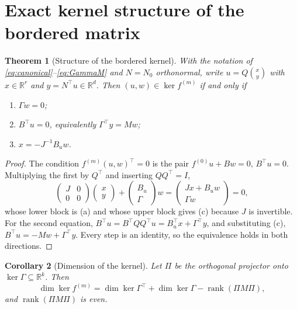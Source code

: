 \documentclass[12pt]{article}
\theoremstyle{plain}
\newtheorem{theorem}{Theorem}[section]
\newtheorem{corollary}[theorem]{Corollary}
\theoremstyle{definition}
\theoremstyle{remark}
\newcommand{\R}{\mathbb{R}}
\DeclareMathOperator{\rank}{rank}
\begin{document}
	\section{Exact kernel structure of the bordered matrix}
	\label{sec:kernel}
	
	\begin{theorem}[Structure of the bordered kernel]
		\label{thm:kernel}
		With the notation of \eqref{eq:canonical}--\eqref{eq:GammaM} and $N=N_{0}$
		orthonormal, write $u=Q\binom{x}{y}$ with $x\in\R^{r}$ and $y=N^{\top}u\in\R^{d}$.
		Then $(u,w)\in\ker f^{(m)}$ if and only if
		\begin{enumerate}[label=(\alph*),leftmargin=2.2em,itemsep=0.25em]
			\item $\Gamma w=0$;
			\item $B^{\top}u=0$, equivalently $\Gamma^{\top}y=Mw$;
			\item $x=-J^{-1}B_{u}w$.
		\end{enumerate}
	\end{theorem}
	
	\begin{proof}
		The condition $f^{(m)}(u,w)^{\top}=0$ is the pair
		$f^{(0)}u+Bw=0$, $B^{\top}u=0$. Multiplying the first by $Q^{\top}$ and
		inserting $QQ^{\top}=I$,
		\[
		\begin{pmatrix}J&0\\0&0\end{pmatrix}\begin{pmatrix}x\\y\end{pmatrix}
		+\begin{pmatrix}B_{u}\\ \Gamma\end{pmatrix}w
		=\begin{pmatrix}Jx+B_{u}w\\ \Gamma w\end{pmatrix}=0,
		\]
		whose lower block is (a) and whose upper block gives (c) because $J$ is
		invertible. For the second equation,
		$B^{\top}u=B^{\top}QQ^{\top}u=B_{u}^{\top}x+\Gamma^{\top}y$, and substituting
		(c), $B^{\top}u=-Mw+\Gamma^{\top}y$. Every step is an identity, so the
		equivalence holds in both directions.
	\end{proof}
	
	\begin{corollary}[Dimension of the kernel]
		\label{cor:dim}
		Let $\Pi$ be the orthogonal projector onto $\ker\Gamma\subseteq\R^{k}$. Then
		\begin{equation}
			\dim\ker f^{(m)}
			=\dim\ker\Gamma^{\top}+\dim\ker\Gamma-\rank(\Pi M\Pi),
			\label{eq:dim}
		\end{equation}
		and $\rank(\Pi M\Pi)$ is even.
	\end{corollary}
	
\end{document}
